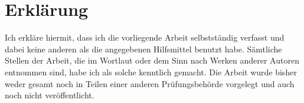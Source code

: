 \chapter*{Erklärung}

Ich erkläre hiermit, dass ich die vorliegende Arbeit selbstständig verfasst und dabei keine anderen als die angegebenen Hilfsmittel benutzt habe. Sämtliche Stellen der Arbeit, die im Wortlaut oder dem Sinn nach Werken anderer Autoren entnommen sind, habe ich als solche kenntlich gemacht. Die Arbeit wurde bisher weder gesamt noch in Teilen einer anderen Prüfungsbehörde vorgelegt und auch noch nicht veröffentlicht.

\bigskip
\noindent
\datum

\vspace{25mm}

\noindent
\name
